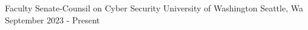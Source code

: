 


\begin{cventries}

  \cventry
    {Faculty Senate-Counsil on Cyber Security} %
    {University of Washington} %
    {Seattle, Wa} %
    {September 2023 - Present} %
    {
    }

    
\end{cventries}
